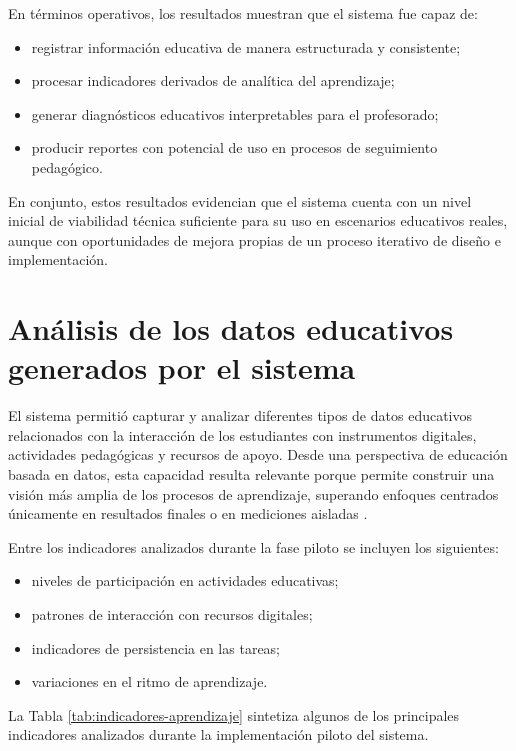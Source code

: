 \begin{refsection}
En términos operativos, los resultados muestran que el sistema fue capaz de:

\begin{itemize}
\item registrar información educativa de manera estructurada y consistente;
\item procesar indicadores derivados de analítica del aprendizaje;
\item generar diagnósticos educativos interpretables para el profesorado;
\item producir reportes con potencial de uso en procesos de seguimiento pedagógico.
\end{itemize}

En conjunto, estos resultados evidencian que el sistema cuenta con un nivel inicial de viabilidad técnica suficiente para su uso en escenarios educativos reales, aunque con oportunidades de mejora propias de un proceso iterativo de diseño e implementación.

\section{Análisis de los datos educativos generados por el sistema}

El sistema permitió capturar y analizar diferentes tipos de datos educativos relacionados con la interacción de los estudiantes con instrumentos digitales, actividades pedagógicas y recursos de apoyo. Desde una perspectiva de educación basada en datos, esta capacidad resulta relevante porque permite construir una visión más amplia de los procesos de aprendizaje, superando enfoques centrados únicamente en resultados finales o en mediciones aisladas \parencite{siemenslong2011,greller2012}.

Entre los indicadores analizados durante la fase piloto se incluyen los siguientes:

\begin{itemize}
\item niveles de participación en actividades educativas;
\item patrones de interacción con recursos digitales;
\item indicadores de persistencia en las tareas;
\item variaciones en el ritmo de aprendizaje.
\end{itemize}

La Tabla \ref{tab:indicadores-aprendizaje} sintetiza algunos de los principales indicadores analizados durante la implementación piloto del sistema.


\end{refsection}
